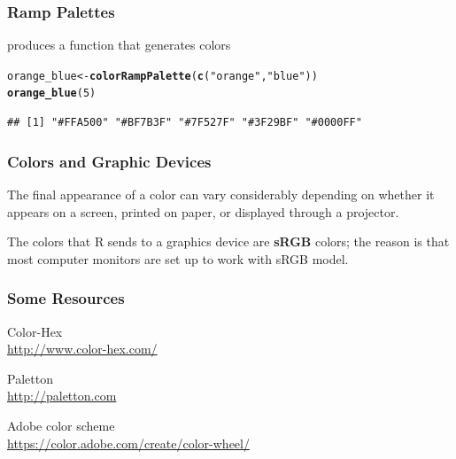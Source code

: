 \documentclass[12pt]{beamer}\usepackage[]{graphicx}\usepackage[]{color}
\makeatletter
\newcommand{\hlnum}[1]{\textcolor[rgb]{0.686,0.059,0.569}{#1}}%
\newcommand{\hlstr}[1]{\textcolor[rgb]{0.192,0.494,0.8}{#1}}%
\newcommand{\hlstd}[1]{\textcolor[rgb]{0.345,0.345,0.345}{#1}}%
\newcommand{\hlkwb}[1]{\textcolor[rgb]{0.69,0.353,0.396}{#1}}%
\newcommand{\hlkwd}[1]{\textcolor[rgb]{0.737,0.353,0.396}{\textbf{#1}}}%
\newenvironment{kframe}{%
 \def\at@end@of@kframe{}%
 \ifinner\ifhmode%
  \def\at@end@of@kframe{\end{minipage}}%
  \begin{minipage}{\columnwidth}%
 \fi\fi%
 \def\FrameCommand##1{\hskip\@totalleftmargin \hskip-\fboxsep
 \colorbox{shadecolor}{##1}\hskip-\fboxsep
     \hskip-\linewidth \hskip-\@totalleftmargin \hskip\columnwidth}%
 \MakeFramed {\advance\hsize-\width
   \@totalleftmargin\z@ \linewidth\hsize
   \@setminipage}}%
 {\par\unskip\endMakeFramed%
 \at@end@of@kframe}
\newenvironment{knitrout}{}{} %
\makeatother
\begin{document}

\begin{frame}[fragile]
\frametitle{Ramp Palettes}

 produces a function that generates  colors
\begin{knitrout}\footnotesize
{}\color{fgcolor}\begin{kframe}
\begin{alltt}
\hlstd{orange_blue} \hlkwb{<-} \hlkwd{colorRampPalette}\hlstd{(}\hlkwd{c}\hlstd{(}\hlstr{"orange"}\hlstd{,} \hlstr{"blue"}\hlstd{))}
\hlkwd{orange_blue}\hlstd{(}\hlnum{5}\hlstd{)}
\end{alltt}
\begin{verbatim}
## [1] "#FFA500" "#BF7B3F" "#7F527F" "#3F29BF" "#0000FF"
\end{verbatim}
\end{kframe}
\end{knitrout}
\eb

\end{frame}


\begin{frame}
\frametitle{Colors and Graphic Devices}

The final appearance of a color can vary considerably depending on whether it appears on a screen, printed on paper, or displayed through a projector.
\eb

The colors that R sends to a graphics device are \textbf{sRGB} colors; the reason is that most computer monitors are set up to work with sRGB model.
\eb

\end{frame}


\begin{frame}
\frametitle{Some Resources}

\bbi
  \item Color-Hex \\
  \url{http://www.color-hex.com/}
  \item Paletton \\
  \url{http://paletton.com}
  \item Adobe color scheme \\
  \url{https://color.adobe.com/create/color-wheel/}
\ei

\end{frame}
\end{document}
